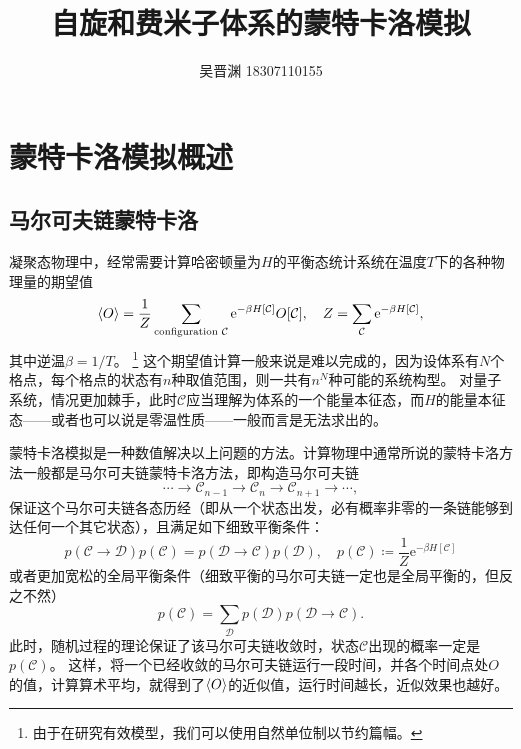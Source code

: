 \documentclass[hyperref, UTF8]{ctexart}
\title{自旋和费米子体系的蒙特卡洛模拟}
\author{吴晋渊 18307110155}
\newcommand*{\ee}{\mathrm{e}}
\begin{document}
\maketitle

\section{蒙特卡洛模拟概述}

\subsection{马尔可夫链蒙特卡洛}

凝聚态物理中，经常需要计算哈密顿量为$H$的平衡态统计系统在温度$T$下的各种物理量的期望值
\begin{equation}
    \expval{O} = \frac{1}{Z} \sum_{\text{configuration $\mathcal{C}$}} \ee^{- \beta H[\mathcal{C}]} O[\mathcal{C}], \quad Z = \sum_{\mathcal{C}} \ee^{- \beta H[\mathcal{C}]},
    \label{eq:sampling}
\end{equation}
其中逆温$\beta = 1 / T$。%
\footnote{
    由于在研究有效模型，我们可以使用自然单位制以节约篇幅。
}%
这个期望值计算一般来说是难以完成的，因为设体系有$N$个格点，每个格点的状态有$n$种取值范围，则一共有$n^N$种可能的系统构型。
对量子系统，情况更加棘手，此时$\mathcal{C}$应当理解为体系的一个能量本征态，而$H$的能量本征态——或者也可以说是零温性质——一般而言是无法求出的。

蒙特卡洛模拟是一种数值解决以上问题的方法。计算物理中通常所说的蒙特卡洛方法一般都是马尔可夫链蒙特卡洛方法，即构造马尔可夫链
\begin{equation}
    \cdots \rightarrow \mathcal{C}_{n-1} \rightarrow \mathcal{C}_n \rightarrow \mathcal{C}_{n+1} \rightarrow \cdots,
\end{equation}
保证这个马尔可夫链各态历经（即从一个状态出发，必有概率非零的一条链能够到达任何一个其它状态），且满足如下细致平衡条件：
\begin{equation}
    p(\mathcal{C} \to \mathcal{D}) p(\mathcal{C}) = p(\mathcal{D} \to \mathcal{C}) p(\mathcal{D}), \quad p(\mathcal{C}) \coloneqq \frac{1}{Z} \ee^{- \beta H[\mathcal{C}]}
\end{equation}
或者更加宽松的全局平衡条件（细致平衡的马尔可夫链一定也是全局平衡的，但反之不然）
\begin{equation}
    p(\mathcal{C}) = \sum_\mathcal{D} p(\mathcal{D}) p(\mathcal{D} \to \mathcal{C}).
\end{equation}
此时，随机过程的理论保证了该马尔可夫链收敛时，状态$\mathcal{C}$出现的概率一定是$p(\mathcal{C})$。
这样，将一个已经收敛的马尔可夫链运行一段时间，并各个时间点处$O$的值，计算算术平均，就得到了$\expval{O}$的近似值，运行时间越长，近似效果也越好。
\end{document}

